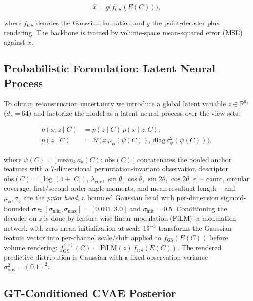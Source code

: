 \begin{equation}
    \hat{x} = g\big(f_{\mathrm{GS}}(E(C))\big),
    \label{eq:deterministic}
\end{equation}

where $f_{\mathrm{GS}}$ denotes the Gaussian formation and $g$ the
point-decoder plus rendering. The backbone is trained by
volume-space mean-squared error (MSE) against $x$.

\subsection{Probabilistic Formulation: Latent Neural Process}
\label{sec:method:prob}

To obtain reconstruction uncertainty we introduce a global latent
variable $z\in\mathbb{R}^{d_z}$ ($d_z=64$) and factorize the model as a
latent neural process \cite{garnelo2018neural,garnelo2018latent} over
the view sets:

\begin{align}
    p(x, z \mid C) &= p(z\mid C)\, p(x\mid z, C),
    \label{eq:joint}\\
    p(z\mid C) &= \mathcal{N}\big(z; \mu_\phi(\psi(C)),\,
        \mathrm{diag}\,\sigma_\phi^2(\psi(C))\big),
    \label{eq:prior}
\end{align}

where $\psi(C)=\big[\,\mathrm{mean}_{k}\, a_k(C);\ \mathrm{obs}(C)\,\big]$
concatenates the pooled anchor features with a 7-dimensional
permutation-invariant observation descriptor
$\mathrm{obs}(C)=\big[\log(1{+}|C|),\, \lambda_{\mathrm{cov}},\,
\sin\bar\theta, \,\cos\bar\theta,\, \sin 2\bar\theta,\,
\cos 2\bar\theta,\, r\big]$ --
count, circular coverage, first/second-order angle moments, and mean
resultant length -- and $\mu_\phi,\sigma_\phi$ are the \emph{prior head},
a bounded Gaussian head with per-dimension sigmoid-bounded
$\sigma\in[\sigma_{\min},\sigma_{\max}]=[0.001,3.0]$ and
$\sigma_{\mathrm{init}}=0.5$. Conditioning the decoder on $z$ is done by
feature-wise linear modulation (FiLM): a modulation network with
zero-mean initialization at scale $10^{-3}$ transforms the Gaussian
feature vector into per-channel scale/shift applied to
$f_{\mathrm{GS}}(E(C))$ before volume rendering:
$f_{\mathrm{GS}}^{(z)}(C)=\mathrm{FiLM}(z)\,f_{\mathrm{GS}}(E(C))$. The
rendered predictive distribution is Gaussian with a fixed observation
variance $\sigma_{\mathrm{obs}}^2=(0.1)^2$.

\subsection{GT-Conditioned CVAE Posterior}
\label{sec:method:p5}

